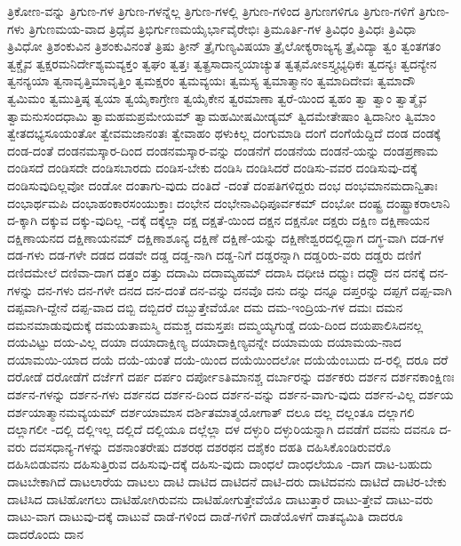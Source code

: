 {ತ್ರಿಕೋಣ-ವನ್ನು
ತ್ರಿಗುಣ-ಗಳ
ತ್ರಿಗುಣ-ಗಳನ್ನೆಲ್ಲ
ತ್ರಿಗುಣ-ಗಳಲ್ಲಿ
ತ್ರಿಗುಣ-ಗಳಿಂದ
ತ್ರಿಗುಣಗಳಿಗೂ
ತ್ರಿಗುಣ-ಗಳಿಗೆ
ತ್ರಿಗುಣ-ಗಳು
ತ್ರಿಗುಣಮಯ-ವಾದ
ತ್ರಿಧೈವ
ತ್ರಿಭಿರ್ಗುಣಮಯೈರ್ಭಾವೈರೇಭಿಃ
ತ್ರಿಮೂರ್ತಿ-ಗಳ
ತ್ರಿವಿಧಂ
ತ್ರಿವಿಧಃ
ತ್ರಿವಿಧಾ
ತ್ರಿವಿಧೋ
ತ್ರಿಶಂಕುವಿನ
ತ್ರಿಶಂಕುವಿನಂತೆ
ತ್ರಿಷು
ತ್ರೀನ್
ತ್ರೈಗುಣ್ಯವಿಷಯಾ
ತ್ರೈಲೋಕ್ಯರಾಜ್ಯಸ್ಯ
ತ್ರೈವಿದ್ಯಾ
ತ್ವಂ
ತ್ವಂತಗತಂ
ತ್ವಕ್ಚೈವ
ತ್ವಕ್ಷರಮನಿರ್ದೇಶ್ಯಮವ್ಯಕ್ತಂ
ತ್ವಘಂ
ತ್ವತ್ತಃ
ತ್ವತ್ಪ್ರಸಾದಾನ್ಮಯಾಚ್ಯುತ
ತ್ವತ್ಸಮೋಽಸ್ತ್ಯಭ್ಯಧಿಕಃ
ತ್ವದನ್ಯಃ
ತ್ವದನ್ಯೇನ
ತ್ವನನ್ಯಯಾ
ತ್ವನಾವೃತ್ತಿಮಾವೃತ್ತಿಂ
ತ್ವಮಕ್ಷರಂ
ತ್ವಮವ್ಯಯಃ
ತ್ವಮಸ್ಯ
ತ್ವಮಾತ್ಮಾನಂ
ತ್ವಮಾದಿದೇವಃ
ತ್ವಮಾದೌ
ತ್ವಮಿಮಂ
ತ್ವಮುತ್ತಿಷ್ಠ
ತ್ವಯಾ
ತ್ವಯೈಕಾಗ್ರೇಣ
ತ್ವಯೈಕೇನ
ತ್ವರಮಾಣಾ
ತ್ವರೆ-ಯಿಂದ
ತ್ವಹಂ
ತ್ವಾ
ತ್ವಾಂ
ತ್ವಾತ್ಮೈವ
ತ್ವಾಮನುಸಂದಧಾಮಿ
ತ್ವಾಮಹಮಪ್ರಮೇಯಮ್
ತ್ವಾಮಹಮೀಷಮೀಡ್ಯಮ್
ತ್ವಿದಮೇತೇಷಾಂ
ತ್ವಿದಾನೀಂ
ತ್ವಿಮಾಂ
ತ್ವೇತದಭ್ಯಸೂಯಂತೋ
ತ್ವೇವಮಜಾನಂತಃ
ತ್ವೇವಾಹಂ
ಥಳುಕಿಲ್ಲ
ದಂಗುಮಾಡಿ
ದಂಗೆ
ದಂಗೆಯೆದ್ದಿದೆ
ದಂಡ
ದಂಡಕ್ಕೆ
ದಂಡ-ದಂತೆ
ದಂಡನಮಸ್ಕಾರ-ದಿಂದ
ದಂಡನಮಸ್ಕಾರ-ವನ್ನು
ದಂಡನೆಗೆ
ದಂಡನೆಯ
ದಂಡನೆ-ಯನ್ನು
ದಂಡಪ್ರಣಾಮ
ದಂಡಿಸದೆ
ದಂಡಿಸದೇ
ದಂಡಿಸಬಾರದು
ದಂಡಿಸ-ಬೇಕು
ದಂಡಿಸಿ
ದಂಡಿಸಿದರೆ
ದಂಡಿಸು-ವವರ
ದಂಡಿಸುವು-ದಕ್ಕೆ
ದಂಡಿಸುವುದಿಲ್ಲವೋ
ದಂಡೋ
ದಂತಾಗು-ವುದು
ದಂತಿದೆ
-ದಂತೆ
ದಂಪತಿಗಳಿದ್ದರು
ದಂಭ
ದಂಭಮಾನಮದಾನ್ವಿತಾಃ
ದಂಭಾರ್ಥಮಪಿ
ದಂಭಾಹಂಕಾರಸಂಯುಕ್ತಾಃ
ದಂಭೇನ
ದಂಭೇನಾವಿಧಿಪೂರ್ವಕಮ್
ದಂಭೋ
ದಂಷ್ಟ್ರ
ದಂಷ್ಟ್ರಾಕರಾಲಾನಿ
ದ-ಕ್ಕಾಗಿ
ದಕ್ಕುವ
ದಕ್ಕು-ವುದಿಲ್ಲ
-ದಕ್ಕೆ
ದಕ್ಕೆಲ್ಲಾ
ದಕ್ಷ
ದಕ್ಷತೆ-ಯಿಂದ
ದಕ್ಷನ
ದಕ್ಷನೋ
ದಕ್ಷರು
ದಕ್ಷಿಣ
ದಕ್ಷಿಣಾಯನ
ದಕ್ಷಿಣಾಯನದ
ದಕ್ಷಿಣಾಯನಮ್
ದಕ್ಷಿಣಾಶೂನ್ಯ
ದಕ್ಷಿಣೆ
ದಕ್ಷಿಣೆ-ಯನ್ನು
ದಕ್ಷಿಣೇಶ್ವರದಲ್ಲಿದ್ದಾಗ
ದಗ್ಧ-ವಾಗಿ
ದಡ-ಗಳ
ದಡ-ಗಳು
ದಡ-ಗಳೇ
ದಡದ
ದಡವೇ
ದಡ್ಡ
ದಡ್ಡ-ನಾಗಿ
ದಡ್ಡ-ನಿಗೆ
ದಡ್ಡರನ್ನಾಗಿ
ದಡ್ಡರಿರು-ವರು
ದಡ್ಡರು
ದಣಿಗೆ
ದಣಿದಮೇಲೆ
ದಣಿವಾ-ದಾಗ
ದತ್ತಂ
ದತ್ತು
ದದಾಮಿ
ದದಾಮ್ಯಹಮ್
ದದಾಸಿ
ದಧೀಚಿ
ದಧ್ಮುಃ
ದಧ್ಮೌ
ದನ
ದನಕ್ಕೆ
ದನ-ಗಳನ್ನು
ದನ-ಗಳು
ದನ-ಗಳೇ
ದನದ
ದನ-ದಂತೆ
ದನ-ವನ್ನು
ದನವೊ
ದನು
ದನ್ನು
ದನ್ನೂ
ದಪ್ತರನ್ನು
ದಪ್ಪಗೆ
ದಪ್ಪ-ವಾಗಿ
ದಪ್ಪವಾಗಿ-ದ್ದೇನೆ
ದಪ್ಪ-ವಾದ
ದಬ್ಬಿ
ದಬ್ಬಿದರೆ
ದಬ್ಬುತ್ತೇವೆಯೋ
ದಮ
ದಮ-ಇಂದ್ರಿಯ-ಗಳ
ದಮಃ
ದಮನ
ದಮನಮಾಡುವುದುಕ್ಕೆ
ದಮಯತಾಮಸ್ಮಿ
ದಮಶ್ಚ
ದಮಸ್ತಪಃ
ದಮ್ಮಯ್ಯಗುಡ್ಡೆ
ದಯ-ದಿಂದ
ದಯಪಾಲಿಸಿದನಲ್ಲ
ದಯವಿಟ್ಟು
ದಯ-ವಿಲ್ಲ
ದಯಾ
ದಯಾದಾಕ್ಷಿಣ್ಯ
ದಯಾದಾಕ್ಷಿಣ್ಯವನ್ನೇ
ದಯಾಮಯ
ದಯಾಮಯ-ನಾದ
ದಯಾಮಯಿ-ಯಾದ
ದಯೆ
ದಯೆ-ಯಂತೆ
ದಯೆ-ಯಿಂದ
ದಯೆಯಿಂದಲೋ
ದಯೆಯೆಂಬುದು
ದ-ರಲ್ಲಿ
ದರೂ
ದರೆ
ದರೋಡೆ
ದರೋಡೆಗೆ
ದರ್ಜೆಗೆ
ದರ್ಪ
ದರ್ಪಂ
ದರ್ಪೋಽತಿಮಾನಶ್ಚ
ದರ್ಬಾರನ್ನು
ದರ್ಶಕರು
ದರ್ಶನ
ದರ್ಶನಕಾಂಕ್ಷಿಣಃ
ದರ್ಶನ-ಗಳನ್ನು
ದರ್ಶನ-ಗಳು
ದರ್ಶನದ
ದರ್ಶನ-ದಿಂದ
ದರ್ಶನ-ವನ್ನು
ದರ್ಶನ-ವಾಗು-ವುದು
ದರ್ಶನ-ವಿಲ್ಲ
ದರ್ಶಯ
ದರ್ಶಯಾತ್ಮಾನಮವ್ಯಯಮ್
ದರ್ಶಯಾಮಾಸ
ದರ್ಶಿತಮಾತ್ಮಯೋಗಾತ್
ದಲೂ
ದಲ್ಲ
ದಲ್ಲಂತೂ
ದಲ್ಲಾಗಲಿ
ದಲ್ಲಾಗಲೀ
-ದಲ್ಲಿ
ದಲ್ಲಿಇಲ್ಲ
ದಲ್ಲಿದೆ
ದಲ್ಲಿಯೂ
ದಲ್ಲೆಲ್ಲಾ
ದಳ
ದಳ್ಳುರಿ
ದಳ್ಳುರಿಯನ್ನಾಗಿ
ದವಡೆಗೆ
ದವನು
ದವನೂ
ದ-ವರು
ದವಸಧಾನ್ಯ-ಗಳನ್ನು
ದಶನಾಂತರೇಷು
ದಶರಥ
ದಶರಥನ
ದಶೈಕಂ
ದಹತಿ
ದಹಿಸಿಕೊಂಡಿರುವರೊ
ದಹಿಸಿಬಿಡುವನು
ದಹಿಸುತ್ತಿರುವ
ದಹಿಸುವು-ದಕ್ಕೆ
ದಹಿಸು-ವುದು
ದಾಂಧಲೆ
ದಾಂಧಲೆಯೂ
-ದಾಗ
ದಾಟ-ಬಹುದು
ದಾಟಬೇಕಾಗಿದೆ
ದಾಟಲಾರೆಯ
ದಾಟಲು
ದಾಟಿ
ದಾಟಿದ
ದಾಟಿದನೆ
ದಾಟಿ-ದರು
ದಾಟಿದವನು
ದಾಟಿದೆ
ದಾಟಿರ-ಬೇಕು
ದಾಟಿಸಿದ
ದಾಟಿಹೋಗಲು
ದಾಟಿಹೋಗಿರುವನು
ದಾಟಿಹೋಗುತ್ತೇವೆಯೊ
ದಾಟುತ್ತಾರೆ
ದಾಟು-ತ್ತೇವೆ
ದಾಟು-ವರು
ದಾಟು-ವಾಗ
ದಾಟುವು-ದಕ್ಕೆ
ದಾಟುವೆ
ದಾಡೆ-ಗಳಿಂದ
ದಾಡೆ-ಗಳಿಗೆ
ದಾಡೆಯೊಳಗೆ
ದಾತವ್ಯಮಿತಿ
ದಾದರೂ
ದಾದರೊಂದು
ದಾನ
}
